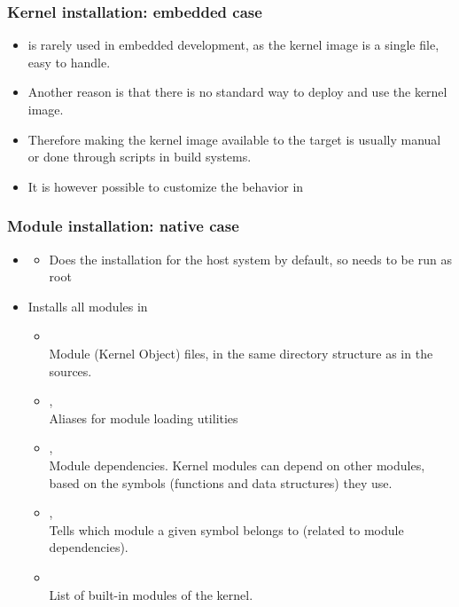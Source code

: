 \begin{frame}
  \frametitle{Kernel installation: embedded case}
  \begin{itemize}
  \item {} is rarely used in embedded development, as the
    kernel image is a single file, easy to handle.
  \item Another reason is that there is no standard way to deploy and
    use the kernel image.
  \item Therefore making the kernel image available to the target is
    usually manual or done through scripts in build systems.
  \item It is however possible to customize the 
    behavior in 
  \end{itemize}
\end{frame}

\begin{frame}
  \frametitle{Module installation: native case}
  \begin{itemize}
  \item {}
    \begin{itemize}
    \item Does the installation for the host system by default, so
      needs to be run as root
    \end{itemize}
  \item Installs all modules in 
    \begin{itemize}
    \item {}\\
      Module  (Kernel Object) files, in the same directory
      structure as in the sources.
    \item {}, \\
      Aliases for module loading utilities
    \item {}, \\
        Module dependencies. Kernel modules can depend on other modules,
        based on the symbols (functions and data structures) they use.
    \item {}, \\
      Tells which module a given symbol belongs to (related to
      module dependencies).
    \item {}\\
      List of built-in modules of the kernel.
    \end{itemize}
  \end{itemize}
\end{frame}


